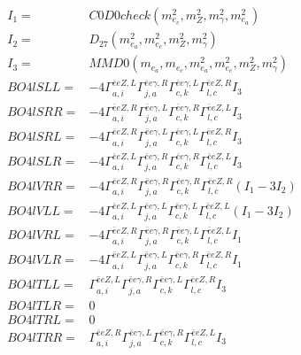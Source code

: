 \documentclass[A4,landscape]{article}
\begin{document}
\begin{align} 
I_1 = & C0D0check(m^2_{e_{{c}}}, m^2_{Z}, m^2_{\gamma}, m^2_{e_{{a}}}) \\ 
I_2 = & D_{27}(m^2_{e_{{a}}}, m^2_{e_{{c}}}, m^2_{Z}, m^2_{\gamma}) \\ 
I_3 = & MMD0(m_{e_{{a}}}, m_{e_{{c}}}, m^2_{e_{{a}}}, m^2_{e_{{c}}}, m^2_{Z}, m^2_{\gamma}) \\ 
  BO4lSLL= & -4  \Gamma^{\bar{e}e Z ,L}_{a, i} \Gamma^{\bar{e}e \gamma ,R}_{j, a} \Gamma^{\bar{e}e \gamma ,L}_{c, k} \Gamma^{\bar{e}e Z ,R}_{l, c} I_3 \\ 
  BO4lSRR= & -4  \Gamma^{\bar{e}e Z ,R}_{a, i} \Gamma^{\bar{e}e \gamma ,L}_{j, a} \Gamma^{\bar{e}e \gamma ,R}_{c, k} \Gamma^{\bar{e}e Z ,L}_{l, c} I_3 \\ 
  BO4lSRL= & -4  \Gamma^{\bar{e}e Z ,R}_{a, i} \Gamma^{\bar{e}e \gamma ,L}_{j, a} \Gamma^{\bar{e}e \gamma ,L}_{c, k} \Gamma^{\bar{e}e Z ,R}_{l, c} I_3 \\ 
  BO4lSLR= & -4  \Gamma^{\bar{e}e Z ,L}_{a, i} \Gamma^{\bar{e}e \gamma ,R}_{j, a} \Gamma^{\bar{e}e \gamma ,R}_{c, k} \Gamma^{\bar{e}e Z ,L}_{l, c} I_3 \\ 
  BO4lVRR= & -4  \Gamma^{\bar{e}e Z ,R}_{a, i} \Gamma^{\bar{e}e \gamma ,R}_{j, a} \Gamma^{\bar{e}e \gamma ,R}_{c, k} \Gamma^{\bar{e}e Z ,R}_{l, c} (I_1 - 3 I_2) \\ 
  BO4lVLL= & -4  \Gamma^{\bar{e}e Z ,L}_{a, i} \Gamma^{\bar{e}e \gamma ,L}_{j, a} \Gamma^{\bar{e}e \gamma ,L}_{c, k} \Gamma^{\bar{e}e Z ,L}_{l, c} (I_1 - 3 I_2) \\ 
  BO4lVRL= & -4  \Gamma^{\bar{e}e Z ,R}_{a, i} \Gamma^{\bar{e}e \gamma ,R}_{j, a} \Gamma^{\bar{e}e \gamma ,L}_{c, k} \Gamma^{\bar{e}e Z ,L}_{l, c} I_1 \\ 
  BO4lVLR= & -4  \Gamma^{\bar{e}e Z ,L}_{a, i} \Gamma^{\bar{e}e \gamma ,L}_{j, a} \Gamma^{\bar{e}e \gamma ,R}_{c, k} \Gamma^{\bar{e}e Z ,R}_{l, c} I_1 \\ 
  BO4lTLL= &  \Gamma^{\bar{e}e Z ,L}_{a, i} \Gamma^{\bar{e}e \gamma ,R}_{j, a} \Gamma^{\bar{e}e \gamma ,L}_{c, k} \Gamma^{\bar{e}e Z ,R}_{l, c} I_3 \\ 
  BO4lTLR= & 0 \\ 
  BO4lTRL= & 0 \\ 
  BO4lTRR= &  \Gamma^{\bar{e}e Z ,R}_{a, i} \Gamma^{\bar{e}e \gamma ,L}_{j, a} \Gamma^{\bar{e}e \gamma ,R}_{c, k} \Gamma^{\bar{e}e Z ,L}_{l, c} I_3 \\ 
\end{align} 
\end{document}
